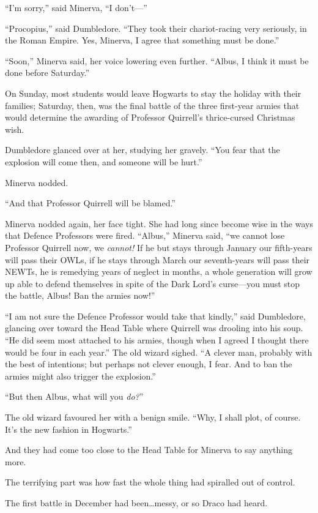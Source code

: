 “I’m sorry,” said Minerva, “I don’t—”

“Procopius,” said Dumbledore. “They took their chariot-racing very seriously, in the Roman Empire. Yes, Minerva, I agree that something must be done.”

“Soon,” Minerva said, her voice lowering even further. “Albus, I think it must be done before Saturday.”

On Sunday, most students would leave Hogwarts to stay the holiday with their families; Saturday, then, was the final battle of the three first-year armies that would determine the awarding of Professor Quirrell’s thrice-cursed Christmas wish.

Dumbledore glanced over at her, studying her gravely. “You fear that the explosion will come then, and someone will be hurt.”

Minerva nodded.

“And that Professor Quirrell will be blamed.”

Minerva nodded again, her face tight. She had long since become wise in the ways that Defence Professors were fired. “Albus,” Minerva said, “we cannot lose Professor Quirrell now, we \emph{cannot!} If he but stays through January our fifth-years will pass their OWLs, if he stays through March our seventh-years will pass their NEWTs, he is remedying years of neglect in months, a whole generation will grow up able to defend themselves in spite of the Dark Lord’s curse—you must stop the battle, Albus! Ban the armies now!”

“I am not sure the Defence Professor would take that kindly,” said Dumbledore, glancing over toward the Head Table where Quirrell was drooling into his soup. “He did seem most attached to his armies, though when I agreed I thought there would be four in each year.” The old wizard sighed. “A clever man, probably with the best of intentions; but perhaps not clever enough, I fear. And to ban the armies might also trigger the explosion.”

“But then Albus, what will you \emph{do?}”

The old wizard favoured her with a benign smile. “Why, I shall plot, of course. It’s the new fashion in Hogwarts.”

And they had come too close to the Head Table for Minerva to say anything more.

\later

The terrifying part was how fast the whole thing had spiralled out of control.

The first battle in December had been…messy, or so Draco had heard.

